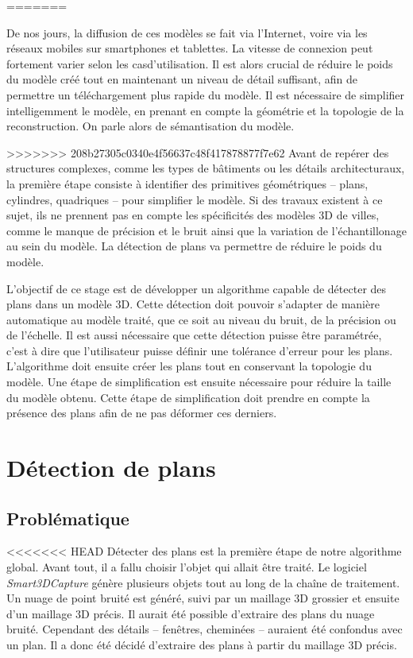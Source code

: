 ﻿\documentclass[12pt, twoside]{article}
\let\oldsection\section
\def\section{\cleardoublepage\oldsection}
\begin{document}
=======

De nos jours, la diffusion de ces modèles se fait via l'Internet, voire via les réseaux mobiles sur smartphones et tablettes. La vitesse de connexion peut fortement varier selon les casd'utilisation. Il est alors crucial de réduire le poids du modèle créé tout en maintenant un niveau de détail suffisant, afin de permettre un téléchargement plus rapide du modèle. Il est nécessaire de simplifier intelligemment le modèle, en prenant en compte la géométrie et la topologie de la reconstruction. On parle alors de sémantisation du modèle.

>>>>>>> 208b27305c0340e4f56637c48f417878877f7e62
Avant de repérer des structures complexes, comme les types de bâtiments ou les détails architecturaux, la première étape consiste à identifier des primitives géométriques -- plans, cylindres, quadriques -- pour simplifier le modèle. Si des travaux existent à ce sujet, ils ne prennent pas en compte les spécificités des modèles 3D de villes, comme le manque de précision et le bruit ainsi que la variation de l'échantillonage au sein du modèle. La détection de plans va permettre de réduire le poids du modèle.

L'objectif de ce stage est de développer un algorithme capable de détecter des plans dans un modèle 3D. Cette détection doit pouvoir s'adapter de manière automatique au modèle traité, que ce soit au niveau du bruit, de la précision ou de l'échelle. Il est aussi nécessaire que cette détection puisse être paramétrée, c'est à dire que l'utilisateur puisse définir une tolérance d'erreur pour les plans. L'algorithme doit ensuite créer les plans tout en conservant la topologie du modèle. Une étape de simplification est ensuite nécessaire pour réduire la taille du modèle obtenu. Cette étape de simplification doit prendre en compte la présence des plans afin de ne pas déformer ces derniers.
\newpage

\section{Détection de plans}
\subsection{Problématique}
<<<<<<< HEAD
Détecter des plans est la première étape de notre algorithme global. Avant tout, il a fallu choisir l'objet qui allait être traité. Le logiciel \textit{Smart3DCapture} génère plusieurs objets tout au long de la chaîne de traitement. Un nuage de point bruité est généré, suivi par un maillage 3D grossier et ensuite d'un maillage 3D précis. Il aurait été possible d'extraire des plans du nuage bruité. Cependant des détails -- fenêtres, cheminées -- auraient été confondus avec un plan. Il a donc été décidé d'extraire des plans à partir du maillage 3D précis.
\end{document}
